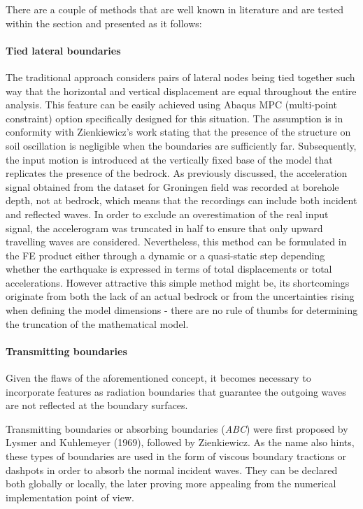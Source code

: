 \documentclass[10pt,a4paper]{report}
\begin{document}
There are a couple of methods that are well known in literature and are tested within the section and presented as it follows: 
 \paragraph{Tied lateral boundaries}
	The traditional approach considers pairs of lateral nodes being tied together such way that the horizontal and vertical displacement are equal throughout the entire analysis. This feature can be easily achieved using Abaqus MPC (multi-point constraint) option specifically designed for this situation. The assumption is in conformity with Zienkiewicz's work stating that the presence of the structure on soil oscillation is negligible when the boundaries are sufficiently far.
	Subsequently, the input motion is introduced at the vertically fixed base of the model that replicates the presence of the bedrock. As previously discussed, the acceleration signal obtained from the dataset for Groningen field was recorded at borehole depth, not at bedrock, which means that the recordings can include both incident and reflected waves. In order to exclude an overestimation of the real input signal, the accelerogram was truncated in half to ensure that only upward travelling waves are considered.
	Nevertheless, this method can be formulated in the FE product either through a dynamic or a quasi-static step depending whether the earthquake is expressed in terms of total displacements or total accelerations.
	However attractive this simple method might be, its shortcomings originate from both the lack of an actual bedrock or from the uncertainties rising when defining the model dimensions - there are no rule of thumbs for determining the truncation of the mathematical model.
	
	\paragraph{Transmitting boundaries}
	Given the flaws of the aforementioned concept, it becomes necessary to incorporate features as radiation boundaries that guarantee the outgoing waves are not reflected at the boundary surfaces. 
	
	Transmitting boundaries or absorbing boundaries (\textit{ABC}) were first proposed by Lysmer and Kuhlemeyer (1969), followed by Zienkiewicz. As the name also hints, these types of boundaries are used in the form of viscous boundary tractions or dashpots in order to absorb the normal incident waves. They can be declared both globally or locally, the later proving more appealing from the numerical implementation point of view.
	
\end{document}
